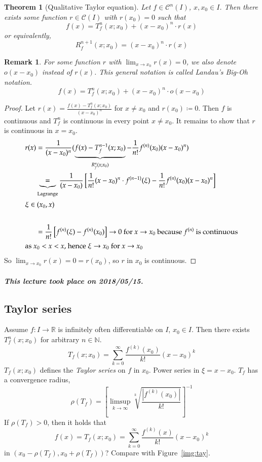 \documentclass{article}
\newtheorem{theorem}{Theorem}  \numberwithin{theorem}{section}
\newtheorem{remark}{Remark}  \numberwithin{remark}{section}
\newcommand{\card}[1]{\left|#1\right|}
\newcommand{\dateref}[1]{\paragraph{\textit{This lecture took place on #1.}}}
\begin{document}
\begin{theorem}[Qualitative Taylor equation]
  Let $f \in \mathcal C^n(I)$, $x, x_0 \in I$. Then there exists some function $r \in \mathcal C(I)$ with $r(x_0) = 0$ such that
  \[ f(x) = T_f^n(x; x_0) + (x - x_0)^n \cdot r(x) \]
  or equivalently,
  \[ R_f^{n+1}(x; x_0) = (x - x_0)^n \cdot r(x) \]
\end{theorem}

\begin{remark}
  For some function $r$ with $\lim_{x\to x_0} r(x) = 0$, we also denote $o(x - x_0)$ instead of $r(x)$.
  This general notation is called Landau's Big-Oh notation.
  \[ f(x) = T_f^n(x; x_0) + (x - x_0)^n \cdot o(x - x_0) \]
\end{remark}

\begin{proof}
  Let $r(x) = \frac{f(x) - T_f^n(x; x_0)}{(x - x_0)^n}$ for $x \neq x_0$ and $r(x_0) \coloneqq 0$.
  Then $f$ is continuous and $T_f^n$ is continuous in every point $x \neq x_0$.
  It remains to show that $r$ is continuous in $x = x_0$.
  \begin{align*}
    r(x) &= \frac{1}{(x - x_0)^n} (\underbrace{f(x) - T_f^{n-1}(x; x_0)}_{R_f^n(x; x_0)} - \frac1{n!} f^{(n)}(x_0)(x - x_0)^n) \\
      &\underbrace{=}_{\text{Lagrange}} \frac{1}{(x - x_0)} \left[ \frac{1}{n!} (x - x_0)^n \cdot f^{(n-1)}(\xi) - \frac{1}{n!} f^{(n)}(x_0)(x - x_0)^n \right] \\
    \intertext{$\xi \in (x_0, x)$} \\
      &= \frac{1}{n!} \left[f^{(n)}(\xi) - f^{(n)}(x_0)\right] \to 0 \text{ for } x \to x_0 \text{ because } f^{(n)} \text{ is continuous} \\
    \intertext{as $x_0 < x < x$, hence $\xi \to x_0$ for $x \to x_0$} 
  \end{align*}
  So $\lim_{x\to x_0} r(x) = 0 = r(x_0)$, so $r$ in $x_0$ is continuous.
\end{proof}

\dateref{2018/05/15}

\subsection{Taylor series}

Assume $f: I \to \mathbb R$ is infinitely often differentiable on $I$, $x_0 \in I$. Then there exists $T_f^n(x; x_0)$ for arbitrary $n \in \mathbb N$.
\[ T_f(x; x_0) = \sum_{k=0}^\infty \frac{f^{(k)}(x_0)}{k!} (x - x_0)^k \]
$T_f(x; x_0)$ defines the \emph{Taylor series} on $f$ in $x_0$.
Power series in $\xi = x - x_0$.
$T_f$ has a convergence radius,
\[ \rho(T_f) = \left[\limsup_{k\to\infty} \sqrt[k]{\frac{\card{f^{(k)}(x_0)}}{k!}}\right]^{-1} \]
If $\rho(T_f) > 0$, then it holds that
\[ f(x) = T_f(x; x_0) = \sum_{k=0}^\infty \frac{f^{(k)}(x)}{k!} (x - x_0)^k \]
in $(x_0 - \rho(T_f), x_0 + \rho(T_f))$?
Compare with Figure~\ref{img:tay}.
\end{document}
